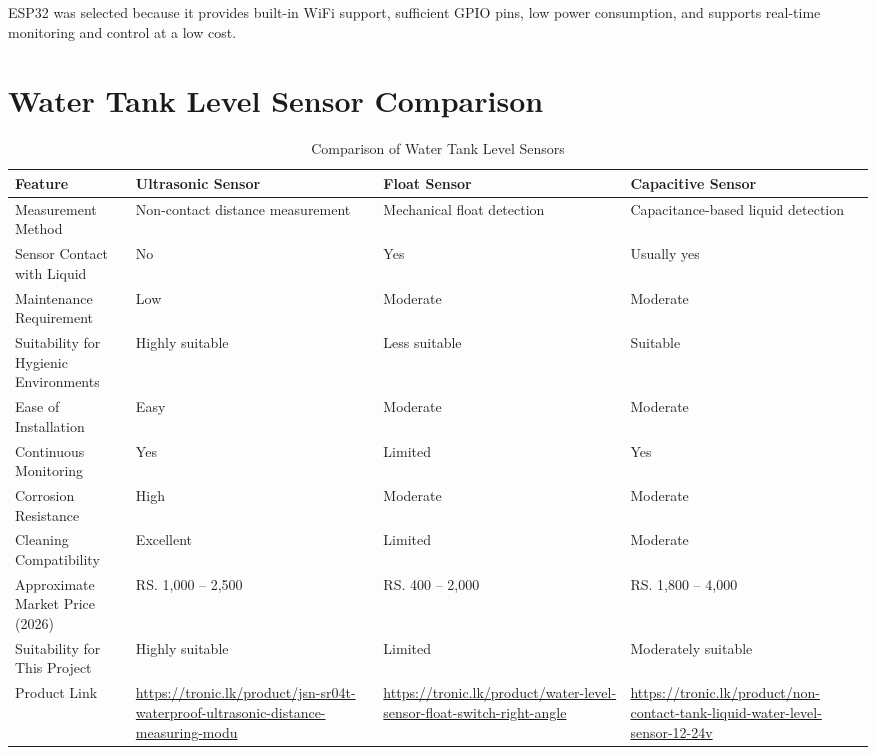 \documentclass[12pt,a4paper]{report}
\begin{document}
ESP32 was selected because it provides built-in WiFi support, sufficient GPIO pins, low power consumption, and supports real-time monitoring and control at a low cost.

\section{Water Tank Level Sensor Comparison}

\begin{table}[H]
\centering
\small
\begin{tabularx}{\textwidth}{|p{3cm}|>{\raggedright\arraybackslash}X|>{\raggedright\arraybackslash}X|>{\raggedright\arraybackslash}X|}
\hline
\textbf{Feature} & \textbf{Ultrasonic Sensor} & \textbf{Float Sensor} & \textbf{Capacitive Sensor} \\
\hline

Measurement Method &
Non-contact distance measurement &
Mechanical float detection &
Capacitance-based liquid detection \\
\hline

Sensor Contact with Liquid &
No &
Yes &
Usually yes \\
\hline

Maintenance Requirement &
Low &
Moderate &
Moderate \\
\hline

Suitability for Hygienic Environments &
Highly suitable &
Less suitable &
Suitable \\
\hline

Ease of Installation &
Easy &
Moderate &
Moderate \\
\hline

Continuous Monitoring &
Yes &
Limited &
Yes \\
\hline

Corrosion Resistance &
High &
Moderate &
Moderate \\
\hline

Cleaning Compatibility &
Excellent &
Limited &
Moderate \\
\hline

Approximate Market Price (2026) &
RS. 1,000 -- 2,500 &
RS. 400 -- 2,000 &
RS. 1,800 -- 4,000 \\
\hline

Suitability for This Project &
Highly suitable &
Limited &
Moderately suitable \\
\hline

Product Link &
\url{https://tronic.lk/product/jsn-sr04t-waterproof-ultrasonic-distance-measuring-modu} &
\url{https://tronic.lk/product/water-level-sensor-float-switch-right-angle} &
\url{https://tronic.lk/product/non-contact-tank-liquid-water-level-sensor-12-24v} \\
\hline

\end{tabularx}
\caption{Comparison of Water Tank Level Sensors}
\end{table}
\end{document}
